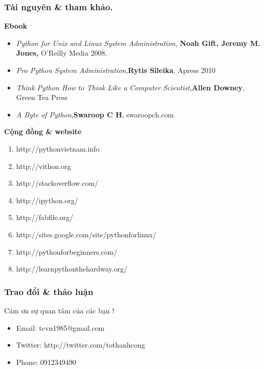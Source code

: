 \documentclass[12pt]{beamer}
\newcommand\sFontvi{\fontsize{8}{7.2}\selectfont} %
\begin{document}
\begin{frame}
\frametitle{Tài nguyên \& tham khảo.}
\framebreak
\pause
\textbf{Ebook}
\framebreak
\pause
\begin{itemize}
\item \textit{Python for Unix and Linux System Administration},\textbf{ Noah Gift, Jeremy M. Jones,} O'Reilly Media 2008.
\item \textit{Pro Python System Administration},\textbf{Rytis Sileika}, Apress 2010
\item \textit{Think Python How to Think Like a Computer Scientist},\textbf{Allen Downey}, Green Tea Press
\item \textit{A Byte of Python},\textbf{Swaroop C H}, swaroopch.com
\end{itemize}
%
\framebreak
\pause
\textbf{Cộng đồng \& website}
\framebreak
\pause
\begin{enumerate}
	\item http://pythonvietnam.info
	\item http://vithon.org
	\item http://stackoverflow.com/
	\item http://ipython.org/
	\item http://fabfile.org/
	\item http://sites.google.com/site/pythonforlinux/	
	\item http://pythonforbeginners.com/
	\item http://learnpythonthehardway.org/
\end{enumerate}
\end{frame}
\begin{frame}
\frametitle{Trao đổi \& thảo luận}
\Huge{\centerline{Cám ơn sự quan tâm của các bạn !}}
\sFontvi	
	\begin{itemize}
		\item Email: tcvn1985@gmail.com
		\item Twitter: http://twitter.com/tothanhcong
		\item Phone: 0912349490
	\end{itemize}
\end{frame}
\end{document}

